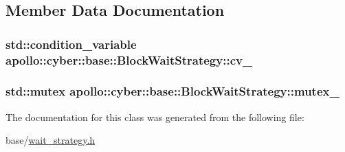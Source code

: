 \subsection{Member Data Documentation}
\hypertarget{classapollo_1_1cyber_1_1base_1_1BlockWaitStrategy_a9bc9e755055037e813f8a180ef4f609d}{
\subsubsection[{cv\-\_\-}]{\setlength{\rightskip}{0pt plus 5cm}std\-::condition\-\_\-variable apollo\-::cyber\-::base\-::\-Block\-Wait\-Strategy\-::cv\-\_\-\hspace{0.3cm}{\ttfamily [private]}}}\label{classapollo_1_1cyber_1_1base_1_1BlockWaitStrategy_a9bc9e755055037e813f8a180ef4f609d}
\hypertarget{classapollo_1_1cyber_1_1base_1_1BlockWaitStrategy_adca22a19b9f79e8a952001bba1286fb0}{
\subsubsection[{mutex\-\_\-}]{\setlength{\rightskip}{0pt plus 5cm}std\-::mutex apollo\-::cyber\-::base\-::\-Block\-Wait\-Strategy\-::mutex\-\_\-\hspace{0.3cm}{\ttfamily [private]}}}\label{classapollo_1_1cyber_1_1base_1_1BlockWaitStrategy_adca22a19b9f79e8a952001bba1286fb0}


The documentation for this class was generated from the following file\-:\begin{DoxyCompactItemize}
\item 
base/\hyperlink{wait__strategy_8h}{wait\-\_\-strategy.\-h}\end{DoxyCompactItemize}
